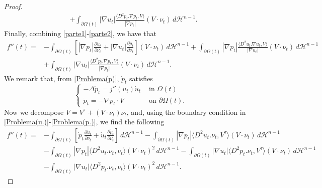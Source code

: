 \documentclass[10pt,a4paper]{amsart}
\newcommand{\abs}[1]{{\left|#1\right|}}
\begin{document}
\begin{proof}
\begin{equation}
\begin{split}
        &+\int_{\partial\Omega(t)}\abs{\nabla u_t}\frac{\langle D^2p_t.\nabla p_t, V\rangle}{\abs{\nabla p_t}}(V\cdot\nu_t)\,d\mathcal{H}^{n-1}.
    \end{split}
\end{equation}
Finally, combining \eqref{parte1}-\eqref{parte2}, we have that
\begin{equation*}
    \begin{split}
        f''(t)=&-\int_{\partial\Omega(t)}\left[\abs{\nabla p_t}\frac{\partial\dot{u}_t}{\partial\nu_t}+\abs{\nabla u_t}\frac{\partial\dot{p}_t}{\partial\nu_t} \right](V\cdot\nu_t)\,d\mathcal{H}^{n-1}+\int_{\partial\Omega(t)}\abs{\nabla p_t}\frac{\langle D^2u_t.\nabla u_t, V\rangle}{\abs{\nabla u_t}}(V\cdot\nu_t)\,d\mathcal{H}^{n-1}\\
        &+\int_{\partial\Omega(t)}\abs{\nabla u_t}\frac{\langle D^2p_t.\nabla p_t, V\rangle}{\abs{\nabla p_t}}(V\cdot\nu_t)\,d\mathcal{H}^{n-1}.
    \end{split}
\end{equation*}
We remark that, from \eqref{Problema(p)}, $\dot{p}_t$ satisfies
\begin{equation}\label{Problema(p.)}
    \begin{cases}
        -\Delta \dot{p}_t=j''(u_t)\dot{u}_t & \text{ in }\Omega(t)\\
        \dot{p}_t=-\nabla p_t\cdot V & \text{ on } \partial\Omega(t).
    \end{cases}
\end{equation}
Now we decompose $V=V^\tau+(V\cdot\nu_t)\nu_t$, and, using the boundary condition in \eqref{Problema(u.)}-\eqref{Problema(p.)}, we find the following
\begin{equation}\label{dersec(2)}
    \begin{split}
        f''(t)=&-\int_{\partial\Omega(t)}\left[\dot{p}_t\frac{\partial\dot{u}_t}{\partial\nu_t}+\dot{u}_t\frac{\partial\dot{p}_t}{\partial\nu_t} \right]\,d\mathcal{H}^{n-1}-\int_{\partial\Omega(t)}\abs{\nabla p_t}\langle D^2u_t.\nu_t,V^\tau\rangle(V\cdot\nu_t)\,d\mathcal{H}^{n-1}\\
        &-\int_{\partial\Omega(t)}\abs{\nabla p_t}\langle D^2u_t.\nu_t,\nu_t\rangle(V\cdot\nu_t)^2\,d\mathcal{H}^{n-1}-\int_{\partial\Omega(t)}\abs{\nabla u_t}\langle D^2p_t.\nu_t,V^\tau\rangle(V\cdot\nu_t)\,d\mathcal{H}^{n-1}\\
        &-\int_{\partial\Omega(t)}\abs{\nabla u_t}\langle D^2p_t.\nu_t,\nu_t\rangle(V\cdot\nu_t)^2\,d\mathcal{H}^{n-1}.
    \end{split}

\end{equation}
\end{proof}
\end{document}
